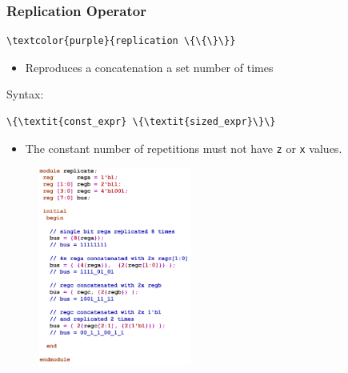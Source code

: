 \documentclass[t, notes, xcolor=table]{beamer}
\begin{document}
\begin{frame}[fragile]
\frametitle{Replication Operator}
\scriptsize{
\begin{multicols}{2}
\begin{Verbatim}[commandchars=\\\{\}, tabsize=2]
\textcolor{purple}{replication \{\{\}\}}
\end{Verbatim}

\begin{itemize}
\item Reproduces a concatenation a set number of times
\end{itemize}


Syntax: 
\begin{Verbatim}[commandchars=\\\{\}, tabsize=2]
\{\textit{const_expr} \{\textit{sized_expr}\}\}
\end{Verbatim}

\begin{itemize}
\item The constant number of repetitions must not have \verb+z+ or \verb+x+ values.
\end{itemize}
\vfill
\columnbreak

\begin{figure}
    \includegraphics[width=0.45\textwidth]{img/05_replica.png}
\end{figure}

\end{multicols}
}
\end{frame}
\end{document}
